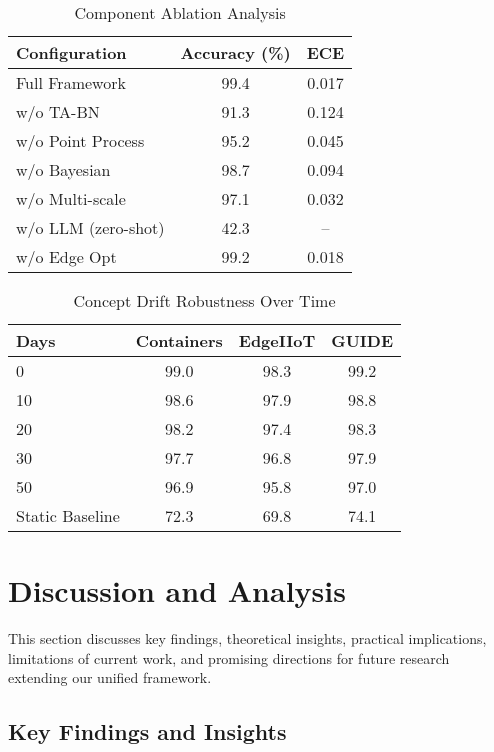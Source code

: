 \documentclass[10pt,journal,compsoc]{IEEEtran}
\begin{document}
\begin{table}[!t]
\centering
\caption{Component Ablation Analysis}
\label{tab:ablation}
\begin{tabular}{lcc}
\toprule
\textbf{Configuration} & \textbf{Accuracy (\%)} & \textbf{ECE} \\
\midrule
Full Framework & 99.4 & 0.017 \\
w/o TA-BN & 91.3 & 0.124 \\
w/o Point Process & 95.2 & 0.045 \\
w/o Bayesian & 98.7 & 0.094 \\
w/o Multi-scale & 97.1 & 0.032 \\
w/o LLM (zero-shot) & 42.3 & -- \\
w/o Edge Opt & 99.2 & 0.018 \\
\bottomrule
\end{tabular}
\end{table}

\begin{table}[!t]
\centering
\caption{Concept Drift Robustness Over Time}
\label{tab:concept_drift}
\begin{tabular}{lccc}
\toprule
\textbf{Days} & \textbf{Containers} & \textbf{EdgeIIoT} & \textbf{GUIDE} \\
\midrule
0 & 99.0 & 98.3 & 99.2 \\
10 & 98.6 & 97.9 & 98.8 \\
20 & 98.2 & 97.4 & 98.3 \\
30 & 97.7 & 96.8 & 97.9 \\
50 & 96.9 & 95.8 & 97.0 \\
\midrule
Static Baseline & 72.3 & 69.8 & 74.1 \\
\bottomrule
\end{tabular}
\end{table}

\section{Discussion and Analysis}
\label{sec:discussion}

This section discusses key findings, theoretical insights, practical implications, limitations of current work, and promising directions for future research extending our unified framework.

\subsection{Key Findings and Insights}
\end{document}
